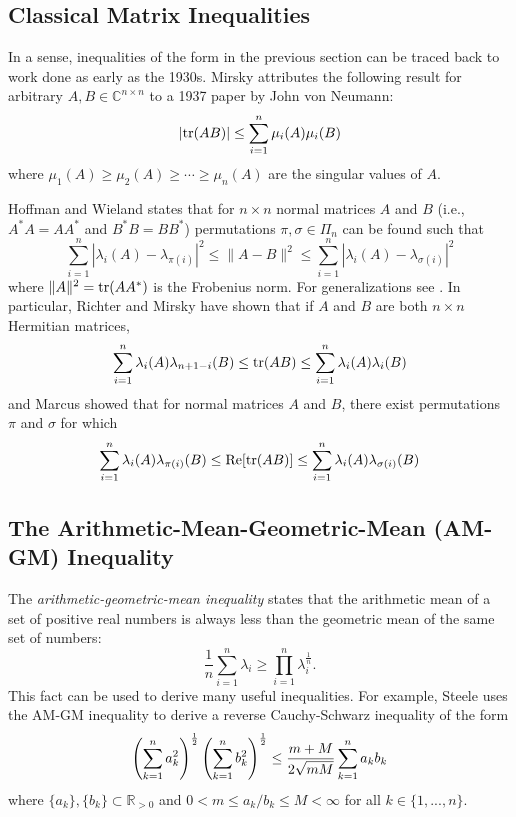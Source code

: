 \documentclass{svmult}
\def\half{ {1\over 2} }
\newcommand{\beq}{ \begin{equation}}
\newcommand{\eeq}{ \end{equation} }
\newcommand{\IR}{\mathbb{R}}
\newcommand{\IC}{\mathbb{C}}
\begin{document}
\subsection{Classical Matrix Inequalities}

In a sense, inequalities of the form in the previous section
can be traced back to work done as early as the 1930s.
 Mirsky \cite{Mirsky3} attributes the following result for
 arbitrary $A, B \in \IC^{n\times n}$ to
 a 1937 paper by John von Neumann:
\beq
|{\rm tr}(AB)| \leq \sum_{i=1}^{n} \mu_i(A) \mu_i(B)
\label{}
\eeq
where $\mu_1(A) \geq \mu_2(A) \geq \cdots \geq \mu_n(A)$
are the singular values of $A$.

Hoffman and Wieland \cite{Wieland} states that for $n\times n$
normal matrices
$A$ and $B$ (i.e., $A^* A = A A^*$ and $B^* B = B B^*$) permutations
$\pi, \sigma \in \Pi_n$ can be found such that
\beq
\sum_{i=1}^{n} |\lambda_i(A) - \lambda_{\pi(i)}|^2 \leq
\|A - B\|^2 \leq \sum_{i=1}^{n} |\lambda_i(A) - \lambda_{\sigma(i)}|^2
\label{}
\eeq
where $\|A\|^2 = {\rm tr}(A A^*)$ is the Frobenius norm.
For generalizations see \cite{COCHRAN}. In particular,
Richter \cite{Richter} and Mirsky \cite{Mirsky} have shown that if $A$ and $B$ are both $n\times n$ Hermitian matrices,
\beq
\sum_{i=1}^{n} \lambda_i(A) \lambda_{n+1-i}(B) \leq {\rm tr}(AB) \leq
\sum_{i=1}^{n} \lambda_i(A) \lambda_{i}(B)
\label{}
\eeq
and Marcus \cite{Marcus} showed that for normal matrices $A$ and $B$,
there exist permutations $\pi$ and $\sigma$ for which
\beq
\sum_{i=1}^{n} \lambda_i(A) \lambda_{\pi(i)}(B) \leq {\rm Re}[{\rm tr}(AB)] \leq
\sum_{i=1}^{n} \lambda_i(A) \lambda_{\sigma(i)}(B)
\label{}
\eeq

\subsection{The Arithmetic-Mean-Geometric-Mean (AM-GM) Inequality} \label{agineqsec}

The {\it arithmetic-geometric-mean inequality} states that the arithmetic mean of a set of positive real
numbers is always less than the geometric mean of the same set of numbers:
\beq
\frac{1}{n} \sum_{i=1}^{n} \lambda_i \geq \prod_{i=1}^{n} \lambda_i^{\frac{1}{n}}.
\label{amgmdef}
\eeq
This fact can be used to derive many useful inequalities. For example, Steele \cite{Steele} uses the AM-GM inequality to derive
a reverse Cauchy-Schwarz inequality of the form
\beq
\left(\sum_{k=1}^{n} a_k^2 \right)^{\half} \left(\sum_{k=1}^{n} b_k^2 \right)^{\half} \leq \frac{m+M}{2 \sqrt{mM}} \sum_{k=1}^{n} a_k b_k
\label{revcsineq2}
\eeq
where $ \{a_k\}, \{b_k\} \subset \IR_{>0}$ and
$0 < m \leq a_k/b_k \leq M < \infty$  for all $k \in \{1,...,n\}$.
\end{document}
